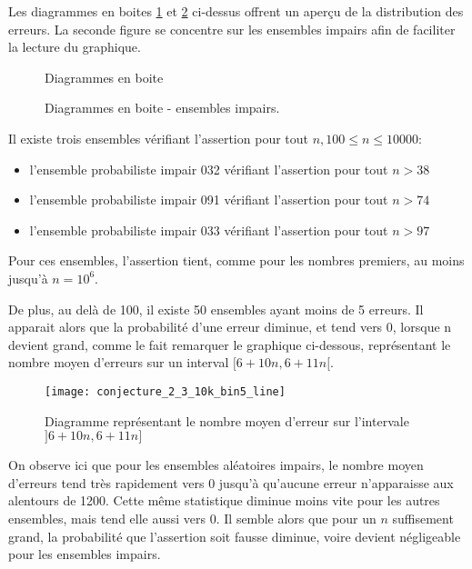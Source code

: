 \documentclass[../main.text]{report}
\begin{document}
Les diagrammes en boites \ref{fig:boxplots} et \ref{fig:boxplots_Odd} ci-dessus offrent un aperçu de la distribution des erreurs. La seconde figure se concentre sur les ensembles impairs afin de faciliter la lecture du graphique.

\begin{figure}[H]
\centering
	\caption{Diagrammes en boite}
	\label{fig:boxplots}
\end{figure}

\begin{figure}[H]
\centering
	\caption{Diagrammes en boite - ensembles impairs.}
	\label{fig:boxplots_Odd}
\end{figure}

Il existe trois ensembles vérifiant l'assertion pour tout $n, 100 \leq n \leq 10000$:
\begin{itemize}
	\item l'ensemble probabiliste impair 032 vérifiant l'assertion pour tout $n > 38$
	\item l'ensemble probabiliste impair 091 vérifiant l'assertion pour tout $n > 74$
	\item l'ensemble probabiliste impair 033 vérifiant l'assertion pour tout $n > 97$
\end{itemize}
Pour ces ensembles, l'assertion tient, comme pour les nombres premiers, au moins jusqu'à $n=10^6$.  

De plus, au delà de 100, il existe 50 ensembles ayant moins de 5 erreurs. 
Il apparait alors que la probabilité d'une erreur diminue, et tend vers 0, lorsque n devient grand, comme le fait remarquer le graphique ci-dessous, représentant le nombre moyen d'erreurs sur un interval $[6+10n, 6+11n[$.
\begin{figure}[H]
\centering
\texttt{[image: conjecture\_2\_3\_10k\_bin5\_line]}
\caption{Diagramme représentant le nombre moyen d'erreur sur l'intervale $]6+10n, 6+11n]$}
\label{fig:conjecture_2_3_10k_bin5_line}
\end{figure}

On observe ici que pour les ensembles aléatoires impairs, le nombre moyen d'erreurs tend très rapidement vers 0 jusqu'à qu'aucune erreur n'apparaisse aux alentours de 1200. Cette même statistique diminue moins vite pour les autres ensembles, mais tend elle aussi vers 0.
Il semble alors que pour un $n$ suffisement grand, la probabilité que l'assertion soit fausse diminue, voire devient négligeable pour les ensembles impairs. 
\end{document}
